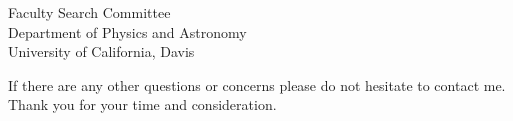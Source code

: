 \documentclass[12pt]{letter}
\begin{document}
\begin{letter}{
               Faculty Search Committee \\
               Department of Physics and Astronomy \\
               University of California, Davis 
           }
%
%

    \normalsize
    If there are any other questions or concerns please do not hesitate to contact me.
    Thank you for your time and consideration.


\end{letter}
\end{document}

